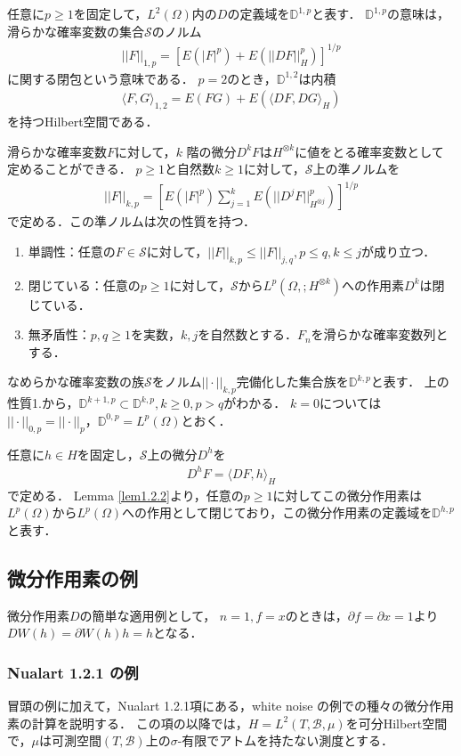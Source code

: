 \documentclass[a4paper,10pt]{jsarticle}
\theoremstyle{plain}
\newcommand{\eq}[1]{\begin{align}#1\end{align}}
\newcommand{\enums}[1]{\begin{enumerate}#1\end{enumerate}}
\begin{document}
任意に$p\ge1$を固定して，$L^2(\Omega)$内の$D$の定義域を$\mathbb{D}^{1,p}$と表す．
$\mathbb{D}^{1,p}$の意味は，滑らかな確率変数の集合$\mathcal{S}$のノルム
\eq{||F||_{1,p}=\left[E(|F|^p)+E(||DF||_H^p)\right]^{1/p}}
に関する閉包という意味である．
$p=2$のとき，$\mathbb{D}^{1,2}$は内積
\eq{\langle F,G\rangle_{1,2}=E(FG)+E(\langle DF,DG\rangle_H)}
を持つHilbert空間である．

滑らかな確率変数$F$に対して，$k$ 階の微分$D^kF$は$H^{\otimes k}$に値をとる確率変数として定めることができる．
$p\ge1$と自然数$k\ge1$に対して，$\mathcal{S}$上の準ノルムを
\eq{||F||_{k,p}=\left[E(|F|^p)\sum_{j=1}^kE\left(||D^jF||^p_{H^{\otimes j}}\right)\right]^{1/p}}
で定める．この準ノルムは次の性質を持つ．
\enums{
	\item 単調性：任意の$F\in\mathcal{S}$に対して，$||F||_{k,p}\le||F||_{j,q},p\le q,k\le j$が成り立つ．
	\item 閉じている：任意の$p\ge1$に対して，$\mathcal{S}$から$L^p\left(\Omega,;H^{\otimes k}\right)$への作用素$D^k$は閉じている．
	\item 無矛盾性：$p,q\ge1$を実数，$k,j$を自然数とする．$F_n$を滑らかな確率変数列とする．
}

なめらかな確率変数の族$\mathcal{S}$をノルム$||\cdot||_{k,p}$完備化した集合族を$\mathbb{D}^{k,p}$と表す．
上の性質1.から，$\mathbb{D}^{k+1,p}\subset\mathbb{D}^{k,p},k\ge0,p>q$がわかる．
$k=0$については$||\cdot||_{0,p}=||\cdot||_p$，$\mathbb{D}^{0,p}=L^p(\Omega)$とおく．

任意に$h\in H$を固定し，$\mathcal{S}$上の微分$D^h$を
\eq{D^hF=\langle DF,h\rangle_H}
で定める．
Lemma \ref{lem1.2.2}より，任意の$p\ge1$に対してこの微分作用素は$L^p(\Omega)$から$L^p(\Omega)$への作用として閉じており，この微分作用素の定義域を$\mathbb{D}^{h,p}$と表す．

\subsection{微分作用素の例}
微分作用素$D$の簡単な適用例として，
$n=1,f=x$のときは，$\partial f=\partial x=1$より$DW(h)=\partial W(h)h=h$となる．

\subsubsection{Nualart \cite{Nualart2006} 1.2.1 の例}
冒頭の例に加えて，Nualart\cite{Nualart2006} 1.2.1項にある，white noise の例での種々の微分作用素の計算を説明する．
この項の以降では，$H=L^2(T,\mathcal{B},\mu)$を可分Hilbert空間で，$\mu$は可測空間$(T,\mathcal{B})$上の$\sigma$-有限でアトムを持たない測度とする．
\end{document}
